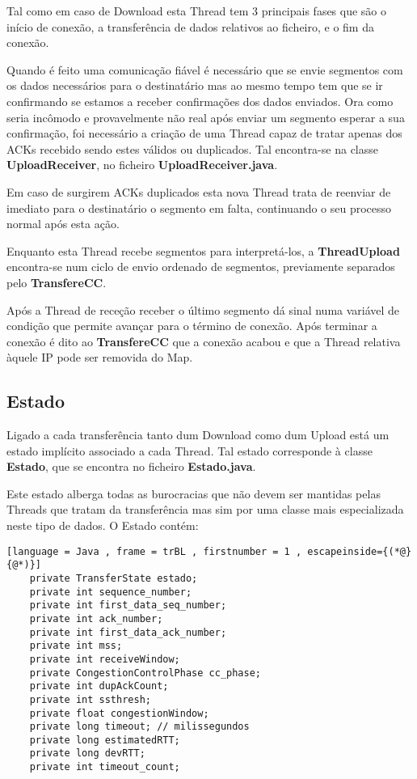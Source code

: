 \documentclass{llncs}
\begin{document}
Tal como em caso de Download esta Thread tem 3 principais fases que são o início de conexão, a transferência de dados relativos ao ficheiro, e o fim da conexão.

Quando é feito uma comunicação fiável é necessário que se envie segmentos com os dados necessários para o destinatário mas ao mesmo tempo tem que se ir confirmando se estamos a receber confirmações dos dados enviados. Ora como seria incômodo e provavelmente não real após enviar um segmento esperar a sua confirmação, foi necessário a criação de uma Thread capaz de tratar apenas dos ACKs recebido sendo estes válidos ou duplicados. Tal encontra-se na classe \textbf{UploadReceiver}, no ficheiro \textbf{UploadReceiver.java}.

Em caso de surgirem ACKs duplicados esta nova Thread trata de reenviar de imediato para o destinatário o segmento em falta, continuando o seu processo normal após esta ação.

Enquanto esta Thread recebe segmentos para interpretá-los, a \textbf{ThreadUpload} encontra-se num ciclo de envio ordenado de segmentos, previamente separados pelo \textbf{TransfereCC}.

Após a Thread de receção receber o último segmento dá sinal numa variável de condição que permite avançar para o término de conexão. Após terminar a conexão é dito ao \textbf{TransfereCC} que a conexão acabou e que a Thread relativa àquele IP pode ser removida do Map.


\subsection{Estado}

Ligado a cada transferência tanto dum Download como dum Upload está um estado implícito associado a cada Thread. Tal estado corresponde à classe \textbf{Estado}, que se encontra no ficheiro \textbf{Estado.java}.

Este estado alberga todas as burocracias que não devem ser mantidas pelas Threads que tratam da transferência mas sim por uma classe mais especializada neste tipo de dados. O Estado contém:

\begin{lstlisting}[language = Java , frame = trBL , firstnumber = 1 , escapeinside={(*@}{@*)}]
    private TransferState estado;
    private int sequence_number;
    private int first_data_seq_number;
    private int ack_number;
    private int first_data_ack_number;
    private int mss;
    private int receiveWindow;
    private CongestionControlPhase cc_phase;
    private int dupAckCount;
    private int ssthresh;
    private float congestionWindow;
    private long timeout; // milissegundos
    private long estimatedRTT;
    private long devRTT;
    private int timeout_count;
\end{lstlisting}
\end{document}
